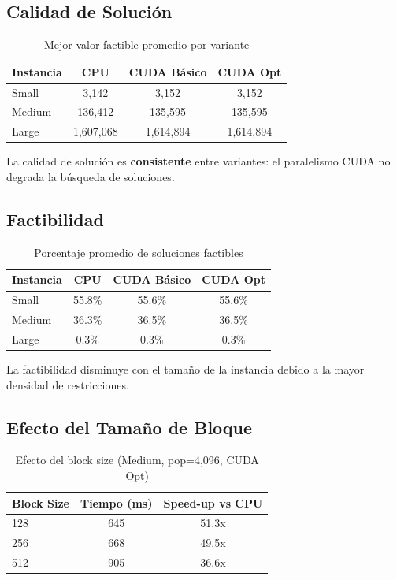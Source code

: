 \documentclass[12pt,a4paper]{article}
\begin{document}
\subsection{Calidad de Soluci\'on}

\begin{table}[H]
\centering
\caption{Mejor valor factible promedio por variante}
\begin{tabular}{lccc}
\toprule
\textbf{Instancia} & \textbf{CPU} & \textbf{CUDA B\'asico} & \textbf{CUDA Opt} \\
\midrule
Small & 3,142 & 3,152 & 3,152 \\
Medium & 136,412 & 135,595 & 135,595 \\
Large & 1,607,068 & 1,614,894 & 1,614,894 \\
\bottomrule
\end{tabular}
\end{table}

La calidad de soluci\'on es \textbf{consistente} entre variantes: el paralelismo CUDA no degrada la b\'usqueda de soluciones.

\subsection{Factibilidad}

\begin{table}[H]
\centering
\caption{Porcentaje promedio de soluciones factibles}
\begin{tabular}{lccc}
\toprule
\textbf{Instancia} & \textbf{CPU} & \textbf{CUDA B\'asico} & \textbf{CUDA Opt} \\
\midrule
Small & 55.8\% & 55.6\% & 55.6\% \\
Medium & 36.3\% & 36.5\% & 36.5\% \\
Large & 0.3\% & 0.3\% & 0.3\% \\
\bottomrule
\end{tabular}
\end{table}

La factibilidad disminuye con el tama\~no de la instancia debido a la mayor densidad de restricciones.

\subsection{Efecto del Tama\~no de Bloque}

\begin{table}[H]
\centering
\caption{Efecto del block size (Medium, pop=4,096, CUDA Opt)}
\begin{tabular}{lcc}
\toprule
\textbf{Block Size} & \textbf{Tiempo (ms)} & \textbf{Speed-up vs CPU} \\
\midrule
128 & 645 & 51.3x \\
256 & 668 & 49.5x \\
512 & 905 & 36.6x \\
\bottomrule
\end{tabular}
\end{table}
\end{document}
